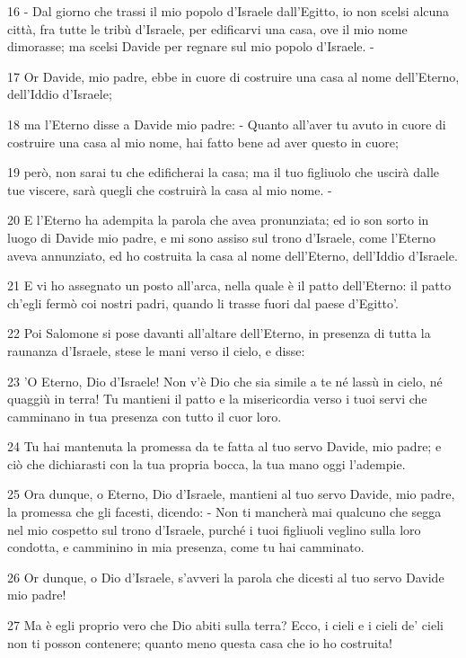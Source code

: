 \par 16 - Dal giorno che trassi il mio popolo d'Israele dall'Egitto, io non scelsi alcuna città, fra tutte le tribù d'Israele, per edificarvi una casa, ove il mio nome dimorasse; ma scelsi Davide per regnare sul mio popolo d'Israele. -
\par 17 Or Davide, mio padre, ebbe in cuore di costruire una casa al nome dell'Eterno, dell'Iddio d'Israele;
\par 18 ma l'Eterno disse a Davide mio padre: - Quanto all'aver tu avuto in cuore di costruire una casa al mio nome, hai fatto bene ad aver questo in cuore;
\par 19 però, non sarai tu che edificherai la casa; ma il tuo figliuolo che uscirà dalle tue viscere, sarà quegli che costruirà la casa al mio nome. -
\par 20 E l'Eterno ha adempita la parola che avea pronunziata; ed io son sorto in luogo di Davide mio padre, e mi sono assiso sul trono d'Israele, come l'Eterno aveva annunziato, ed ho costruita la casa al nome dell'Eterno, dell'Iddio d'Israele.
\par 21 E vi ho assegnato un posto all'arca, nella quale è il patto dell'Eterno: il patto ch'egli fermò coi nostri padri, quando li trasse fuori dal paese d'Egitto'.
\par 22 Poi Salomone si pose davanti all'altare dell'Eterno, in presenza di tutta la raunanza d'Israele, stese le mani verso il cielo, e disse:
\par 23 'O Eterno, Dio d'Israele! Non v'è Dio che sia simile a te né lassù in cielo, né quaggiù in terra! Tu mantieni il patto e la misericordia verso i tuoi servi che camminano in tua presenza con tutto il cuor loro.
\par 24 Tu hai mantenuta la promessa da te fatta al tuo servo Davide, mio padre; e ciò che dichiarasti con la tua propria bocca, la tua mano oggi l'adempie.
\par 25 Ora dunque, o Eterno, Dio d'Israele, mantieni al tuo servo Davide, mio padre, la promessa che gli facesti, dicendo: - Non ti mancherà mai qualcuno che segga nel mio cospetto sul trono d'Israele, purché i tuoi figliuoli veglino sulla loro condotta, e camminino in mia presenza, come tu hai camminato.
\par 26 Or dunque, o Dio d'Israele, s'avveri la parola che dicesti al tuo servo Davide mio padre!
\par 27 Ma è egli proprio vero che Dio abiti sulla terra? Ecco, i cieli e i cieli de' cieli non ti posson contenere; quanto meno questa casa che io ho costruita!

